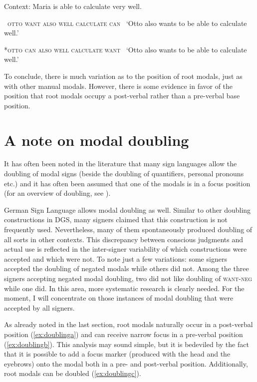 \begin{exe}
\ex Context: Maria is able to calculate very well.\label{calculation}\begin{xlist}
\ex\label{bsp:calculatea}
{\textcolor{white}{*}\textsc{otto want also well calculate can}}    
\glt \textcolor{white}{*}`Otto also wants to be able to calculate well.' 

\ex\label{bsp:calculateb}
{*\textsc{otto can also well calculate want}}    
\glt \textcolor{white}{*}`Otto also wants to be able to calculate well.' 

\end{xlist}
\end{exe}

\noindent To conclude, there is much variation as to the position of root modals, just as with other manual modals. However, there is some evidence in favor of the position that root modals occupy a post-verbal rather than a pre-verbal base position. 


\section{A note on modal doubling}\label{modaldoubling}
It has often been noted in the literature that many sign languages allow the doubling of modal signs (beside the doubling of quantifiers, personal pronouns etc.) and it has often been assumed that one of the modals is in a focus position (for an overview of doubling, see \citealt{petronio1993clause,nunesquadros2008phonetically}).

German Sign Language allows modal doubling as well. Similar to other doubling constructions in DGS, many signers claimed that this construction is not frequently used. Nevertheless, many of them spontaneously produced doubling of all sorts in other contexts. This discrepancy between conscious judgments and actual use is reflected in the inter-signer variability of which constructions were accepted and which were not. To note just a few variations: some signers accepted the doubling of negated modals while others did not. Among the three signers accepting negated modal doubling, two did not like doubling of \textsc{want-neg} while one did. In this area, more systematic research is clearly needed. For the moment, I will concentrate on those instances of modal doubling that were accepted by all signers.

As already noted in the last section, root modals naturally occur in a post-verbal position (\ref{ex:doublinga}) and can receive narrow focus in a pre-verbal position (\ref{ex:doublingb}). This analysis may sound simple, but it is bedeviled by the fact that it is possible to add a focus marker (produced with the head and the eyebrows) onto the modal both in a pre- and post-verbal position. Additionally, root modals can be doubled (\ref{ex:doublingc}). 

